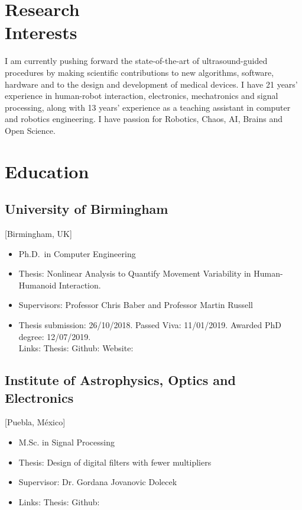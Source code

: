 \documentclass{mycv}
\begin{document}
\maketitle

\section{Research \\ Interests}
I am currently pushing forward the state-of-the-art of ultrasound-guided procedures by making scientific contributions to new algorithms, software, hardware and to the design and development of medical devices.   
I have 21 years' experience in human-robot interaction, electronics, mechatronics and signal processing, along with 13 years' experience as a teaching assistant in computer and robotics engineering. 
I have passion for Robotics, Chaos, AI, Brains and Open Science.

\section{Education}
\subsection{University of Birmingham}[Birmingham, UK]
\vspace{-\parskip}%
\begin{itemize}[label={}]
  \item Ph.D.\ in Computer Engineering 
  \item Thesis: Nonlinear Analysis to Quantify Movement Variability in Human-Humanoid Interaction.   
  \item Supervisors: Professor Chris Baber and  Professor Martin Russell
  \item	Thesis submission: 26/10/2018. Passed Viva: 11/01/2019. Awarded PhD degree: 12/07/2019. \\
	Links: Thesis: \href{https://doi.org/10.5281/zenodo.3384145}{\faFilePdfO}
	Github: \href{http://doi.org/10.5281/zenodo.3384281}{\faGithubAlt}
	Website: \href{https://mxochicale-phd.github.io/site/}{\faExternalLink} 
\end{itemize}

\subsection{Institute of Astrophysics, Optics and Electronics}[Puebla, M\'exico]
\vspace{-\parskip}%
\begin{itemize}[label={}]
  \item M.Sc. in Signal Processing 
  \item Thesis: Design of digital filters with fewer multipliers
  \item Supervisor: Dr. Gordana Jovanovic Dolecek
  \item	Links: 
	Thesis: \href{https://github.com/mxochicale/publications/blob/master/thesis/M.Sc./doc/MPXochicale_MScThesis-2016.pdf}{\faFilePdfO}
	Github: \href{https://github.com/mxochicale/publications/tree/master/thesis/M.Sc.}{\faGithubAlt}
\end{itemize}
\end{document}
